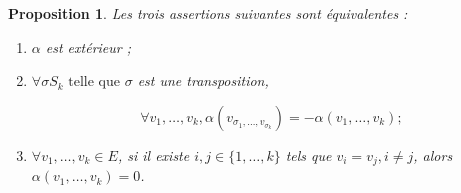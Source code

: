 \documentclass[french]{article}
\newtheorem{prop}{Proposition}[section]
\begin{document}
\begin{prop}
  Les trois assertions suivantes sont équivalentes :

  \begin{enumerate}
    \item \(\alpha\) est extérieur ;
    \item \(\forall \sigma S_k \text{ telle que }  \sigma\) est une transposition,

    \[\forall v_1, \dots, v_k, \alpha(v _{\sigma_1, \dots, v _{\sigma_k}}) = - \alpha(v_1, \dots, v_k) ;\]

    \item \(\forall v_1, \dots, v_k \in E\), si il existe \(i, j \in \{ 1, \dots, k \} \) tels que \(v_i = v_j, i \neq j\), alors \(\alpha(v_1, \dots, v_k) = 0\).
  \end{enumerate}
\end{prop}
\end{document}
